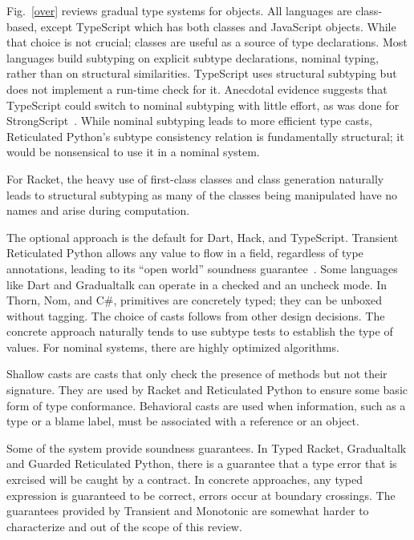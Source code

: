 \documentclass[a4paper,USenglish]{lipics-v2018}
\newcommand{\figref}[1]{Fig.~\ref{#1}\xspace}
\newcounter{lem}
\begin{document}
\figref{over} reviews gradual type systems for objects. All languages are
class-based, except TypeScript which has both classes and JavaScript
objects. While that choice is not crucial; classes are useful as a source of
type declarations. Most languages build subtyping on explicit subtype
declarations, nominal typing, rather than on structural similarities.
TypeScript uses structural subtyping but does not implement a run-time
check for it. Anecdotal evidence suggests that TypeScript could switch
to nominal subtyping with little effort, as was done for
StrongScript~\cite{ecoop15}. While nominal subtyping leads to more
efficient type casts, Reticulated Python's subtype consistency relation is
fundamentally structural; it would be nonsensical to use it in a nominal
system. 

For Racket, the heavy use of first-class classes and class generation
naturally leads to structural subtyping as many of the classes being
manipulated have no names and arise during computation.

The optional approach is the default for Dart, Hack, and TypeScript.
Transient Reticulated Python allows any value to flow in a field, regardless
of type annotations, leading to its ``open world'' soundness
guarantee~\cite{siek14}. Some languages like Dart and Gradualtalk can
operate in a checked and an uncheck mode. In Thorn, Nom, and C\#, primitives
are concretely typed; they can be unboxed without tagging. The choice of
casts follows from other design decisions. The concrete approach naturally
tends to use subtype tests to establish the type of values. For nominal
systems, there are highly optimized algorithms. 

Shallow casts are casts that only check the presence of methods but not
their signature. They are used by Racket and Reticulated Python to ensure
some basic form of type conformance. Behavioral casts are used when
information, such as a type or a blame label, must be associated with a
reference or an object.

Some of the system provide soundness guarantees. In Typed Racket,
Gradualtalk and Guarded Reticulated Python, there is a guarantee that a type
error that is exrcised will be caught by a contract. In concrete approaches,
any typed expression is guaranteed to be correct, errors occur at boundary
crossings. The guarantees provided by Transient and Monotonic are somewhat
harder to characterize and out of the scope of this review.
\end{document}
